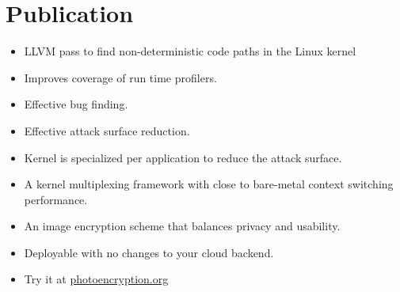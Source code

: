 \documentclass[11pt,a4paper,sans]{moderncv}
\begin{document}
\makecvtitle

\section{Publication}
{
    \begin{itemize}
        \item LLVM pass to find non-deterministic code paths in the Linux
        kernel
        \item Improves coverage of run time profilers.
        \item Effective bug finding.
        \item Effective attack surface reduction.
    \end{itemize}
}

{
    \begin{itemize}
        \item Kernel is specialized per application to reduce the attack
        surface.
        \item A kernel multiplexing framework with close to bare-metal context
        switching performance.
    \end{itemize}
}

{
    \begin{itemize}
    \item An image encryption scheme that balances privacy and usability.
    \item Deployable with no changes to your cloud backend.
    \item Try it at \href{https://photoencryption.org}{photoencryption.org}
    \end{itemize}
}

\end{document}
